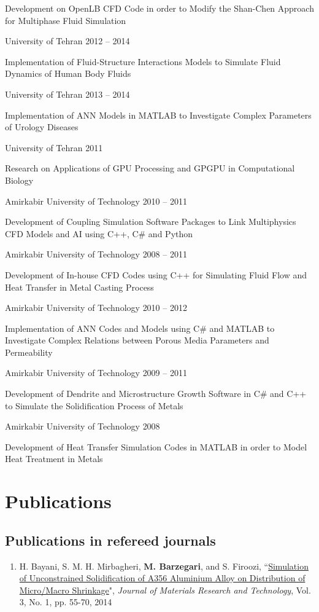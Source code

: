\documentclass{cv}
\begin{document}
{}Development on OpenLB CFD Code in order to Modify the Shan-Chen Approach for Multiphase Fluid Simulation


\datedsubsection
{University of Tehran}
{2012 -- 2014} 

{}Implementation of Fluid-Structure Interactions Models to Simulate Fluid Dynamics of Human Body Fluids

\datedsubsection
{University of Tehran}
{2013 -- 2014}

{}Implementation of ANN Models in MATLAB to Investigate Complex Parameters of Urology Diseases

\datedsubsection
{University of Tehran}
{2011}

{}Research on Applications of GPU Processing and GPGPU in Computational Biology

\datedsubsection
{Amirkabir University of Technology}
{2010 -- 2011}

{}Development of Coupling Simulation Software Packages to Link Multiphysics CFD Models and AI using C++, C\# and Python

\datedsubsection
{Amirkabir University of Technology}
{2008 -- 2011}

{}Development of In-house CFD Codes using C++ for Simulating Fluid Flow and Heat Transfer in Metal Casting Process

\datedsubsection
{Amirkabir University of Technology}
{2010 -- 2012}

{}Implementation of ANN Codes and Models using C\# and MATLAB to Investigate Complex Relations between Porous Media Parameters and Permeability

\datedsubsection
{Amirkabir University of Technology}
{2009 -- 2011}

{}Development of Dendrite and Microstructure Growth Software in C\# and C++ to Simulate the Solidification Process of Metals

\datedsubsection
{Amirkabir University of Technology}
{2008}

{}Development of Heat Transfer Simulation Codes in MATLAB in order to Model Heat Treatment in Metals



\section{Publications}

\subsection{Publications in refereed journals}
\begin{enumerate}
\item
H. Bayani, S. M. H. Mirbagheri, \textbf{M. Barzegari}, and S. Firoozi, ``\href{http://www.sciencedirect.com/science/article/pii/S2238785413001129}{Simulation of Unconstrained Solidification of A356 Aluminium Alloy on Distribution of Micro/Macro Shrinkage}", \textit{Journal of Materials Research and Technology}, Vol. 3, No. 1, pp. 55-70, 2014
\end{enumerate}
\end{document}
